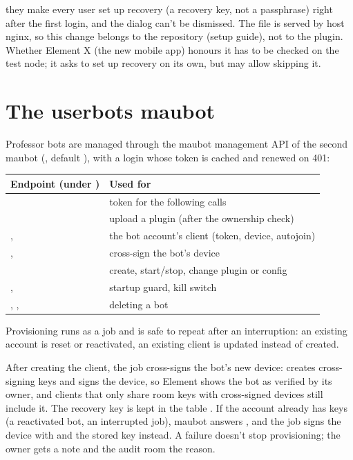they make every user set up recovery (a recovery key, not a passphrase) right after the first
login, and the dialog can't be dismissed. The file is served by host nginx, so this change
belongs to the  repository (setup guide), not to the plugin. Whether
Element X (the new mobile app) honours it has to be checked on the test node; it asks to set
up recovery on its own, but may allow skipping it.

\section{The userbots maubot}

Professor bots are managed through the maubot management API of the second maubot
(, default ), with a login whose token
is cached and renewed on 401:

\begin{center}
\small
\begin{tabularx}{\textwidth}{@{}>{\raggedright\arraybackslash}p{6.4cm}L@{}}
\toprule
\textbf{Endpoint (under )} & \textbf{Used for} \\
\midrule
{} & token for the following calls \\
 & upload a plugin (after the ownership check) \\
,  & the bot account's client (token, device, autojoin) \\
,  & cross-sign the bot's device \\
 & create, start/stop, change plugin or config \\
,  & startup guard, kill switch \\
, ,  & deleting a bot \\
\bottomrule
\end{tabularx}
\end{center}

Provisioning runs as a job and is safe to repeat after an interruption: an existing account
is reset or reactivated, an existing client is updated instead of created.

After creating the client, the job cross-signs the bot's new device:
 creates cross-signing keys and signs the device, so Element shows
the bot as verified by its owner, and clients that only share room keys with cross-signed
devices still include it. The recovery key is kept in the table . If
the account already has keys (a reactivated bot, an interrupted job), maubot answers
, and the job signs the device with  and the stored key instead. A
failure doesn't stop provisioning; the owner gets a note and the audit room the reason.
